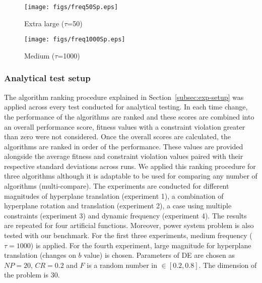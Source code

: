 \documentclass[review]{elsarticle}
\begin{document}
 \begin{figure*}[t!]
        \centering
                \begin{subfigure}[b]{0.48\textwidth}   
            \centering            \texttt{[image: figs/freq50Sp.eps]}
            \caption[]%
            {{\small Extra large ($\tau$=50)}}    
            \label{fig:freq50}
        \end{subfigure}
        \begin{subfigure}[b]{0.48\textwidth}
            \centering        \texttt{[image: figs/freq1000Sp.eps]}
            \caption[]%
            {{\small Medium ($\tau$=1000)}}    
            \label{fig:freq1000}
        \end{subfigure}
        \caption[]
        {\small Sphere time-based plot for hyperplane translation (average of 30 runs),~\ref{fig:freq50}) extra large $\tau$ ~\ref{fig:freq1000}) medium $\tau$} 
        \label{fig:freqchanges}
    \end{figure*}
\subsubsection{Analytical test setup}
The algorithm ranking procedure explained in Section~\ref{subsec:exp-setup} was applied across every test conducted for analytical testing. In each time change, the performance of the algorithms are ranked and these scores are combined into an overall performance score, fitness values with a constraint violation greater than zero were not considered. Once the overall scores are calculated, the algorithms are ranked in order of the performance. These values are provided alongside the average fitness and constraint violation values paired with their respective standard deviations across runs. We applied this ranking procedure for three algorithms although it is adaptable to be used for comparing any number of algorithms (multi-compare).
The experiments are conducted for different magnitudes of hyperplane translation (experiment 1), a combination of hyperplane rotation and translation (experiment 2), a case using multiple constraints (experiment 3) and dynamic frequency (experiment 4). The results are repeated for four artificial functions. Moreover, power system problem is also tested with our benchmark. For the first three experiments, medium frequency ($\tau=1000$) is applied. For the fourth experiment, large magnitude for hyperplane translation (changes on $b$ value) is chosen.
Parameters of DE are chosen as $NP=20$, $CR=0.2$ and $F$ is a random number in $\in[0.2,0.8]$. The dimension of the problem is 30.
\end{document}
